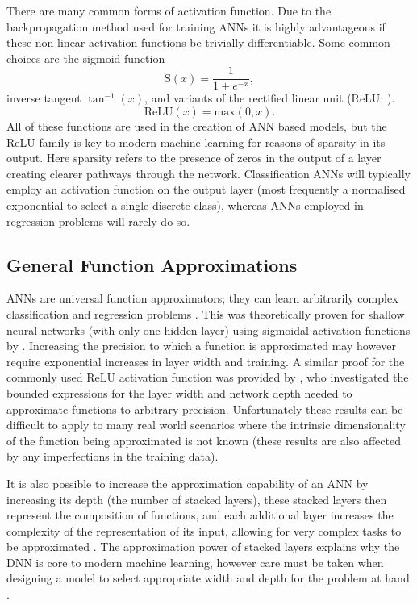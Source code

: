 There are many common forms of activation function.
Due to the backpropagation method used for training ANNs it is highly advantageous if these non-linear activation functions be trivially differentiable.
Some common choices are the sigmoid function
\begin{equation}
    \mathrm{S}(x) = \frac{1}{1+e^{-x}},
\end{equation}
inverse tangent $\tan^{-1}(x)$, and variants of the rectified linear unit (ReLU; \citet{2010Nair}).
\begin{equation}
    \mathrm{ReLU}(x) = \mathrm{max}(0, x).
\end{equation}
All of these functions are used in the creation of ANN based models, but the ReLU family is key to modern machine learning for reasons of sparsity in its output.
Here sparsity refers to the presence of zeros in the output of a layer creating clearer pathways through the network.
Classification ANNs will typically employ an activation function on the output layer (most frequently a normalised exponential to select a single discrete class), whereas ANNs employed in regression problems will rarely do so.

\subsection{General Function Approximations}

ANNs are universal function approximators; they can learn arbitrarily complex classification and regression problems \citep{Rumelhart1986,1989Cybenko}.
This was theoretically proven for shallow neural networks (with only one hidden layer) using sigmoidal activation functions by \citet{1989Cybenko}.
Increasing the precision to which a function is approximated may however require exponential increases in layer width and training.
A similar proof for the commonly used ReLU activation function was provided by \citet{Lu2017}, who investigated the bounded expressions for the layer width and network depth needed to approximate functions to arbitrary precision.
Unfortunately these results can be difficult to apply to many real world scenarios where the intrinsic dimensionality of the function being approximated is not known (these results are also affected by any imperfections in the training data).

It is also possible to increase the approximation capability of an ANN by increasing its depth (the number of stacked layers), these stacked layers then represent the composition of functions, and each additional layer increases the complexity of the representation of its input, allowing for very complex tasks to be approximated \citep{Raschka2015}.
The approximation power of stacked layers explains why the DNN is core to modern machine learning, however care must be taken when designing a model to select appropriate width and depth for the problem at hand \citep{Lu2017}.

